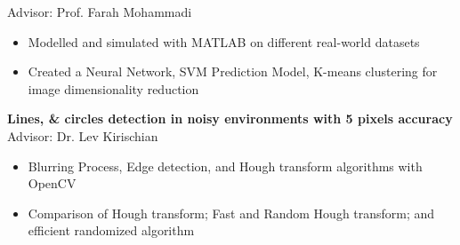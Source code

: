 \begin{cventries}
{\begin{cvitems}
		{\color{awesome} Advisor: Prof. Farah Mohammadi}
		\begin{itemize}
			\item Modelled and simulated with MATLAB on different real-world datasets
			\item Created a Neural Network, SVM Prediction Model, K-means clustering for image dimensionality reduction
		\end{itemize}
		\item \textbf{Lines, \& circles detection in noisy environments with 5 pixels accuracy}
		{\color{awesome} Advisor: Dr. Lev Kirischian}
		\begin{itemize}
			\item Blurring Process, Edge detection, and Hough transform algorithms with OpenCV
			\item Comparison of Hough transform; Fast and Random Hough transform; and efficient randomized algorithm
		\end{itemize}
		\iffalse
		\item \textbf{Reliability evaluation \& build in self repair of reconfigurable}
		\begin{itemize}
			 \item Reliability analysis \& comparison of hierarchical redundancy, optimal repair, coarse redundancy, Tile-based
        	 \item Analysed combinational and sequential circuit test generation methods. memory, delay testing, and testability design methodology
		\end{itemize}				
		\item \textbf{Architecture analysis and high-level synthesis of ASP of a VOP buffer}
		\begin{itemize}
			 \item Analysed a full pipeline variant of architecture to get the highest performance of ASP along with 32-bit Multi-Cycle Processor design
             \item Assessed the economic aspects, power consumption, and VOP area, determined by the available memory
			bandwidth
			\\*
		\end{itemize}
		\item \textbf{Hardware-software co-design, DE2-Altera FPGA based, and Nios II SoPC Development}
		\begin{itemize}
			 \item Utilized real-time scheduling techniques, concurrency, system on chip and hardware software co-design tools
        	 \item Scheduled and investigated RTOS using uVision, RTX, and ARM Cortex M3
        	 \\*
		\end{itemize}\fi
      \end{cvitems}
    }


\end{cventries}
